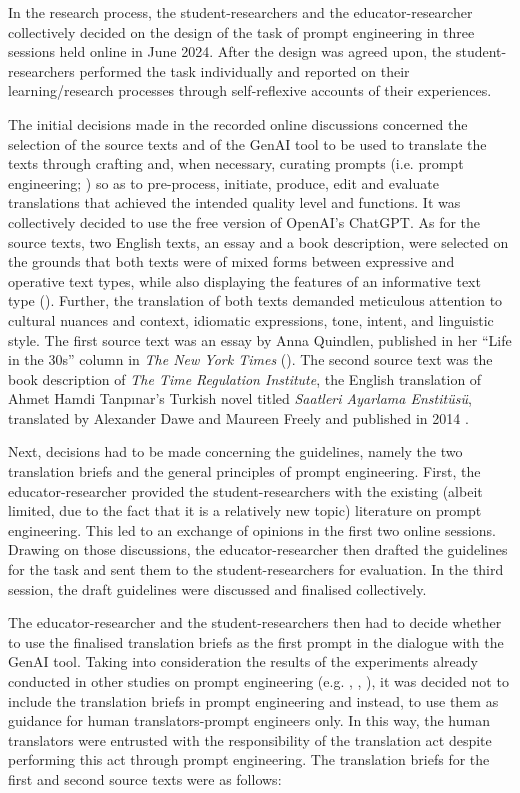 \documentclass[output=paper,colorlinks,citecolor=brown]{langscibook}
\begin{document}
In the research process, the student-researchers and the educator-researcher collectively decided on the design of the task of prompt engineering in three sessions held online in June 2024. After the design was agreed upon, the student-researchers performed the task individually and reported on their learning/research processes through self-reflexive accounts of their experiences.

The initial decisions made in the recorded online discussions concerned the selection of the source texts and of the GenAI tool to be used to translate the texts through crafting and, when necessary, curating prompts (i.e. prompt engineering; \cite{yamada-2023-optimizing}) so as to pre-process, initiate, produce, edit and evaluate translations that achieved the intended quality level and functions. It was collectively decided to use the free version of OpenAI’s ChatGPT. As for the source texts, two English texts, an essay and a book description, were selected on the grounds that both texts were of mixed forms between expressive and operative text types, while also displaying the features of an informative text type (\cite[124--125]{reiss1981}). Further, the translation of both texts demanded meticulous attention to cultural nuances and context, idiomatic expressions, tone, intent, and linguistic style. The first source text was an essay by Anna Quindlen, published in her “Life in the 30s” column in \textit{The New York Times} (\cite{quindlen1987}). The second source text was the book description of \textit{The Time Regulation Institute}, the English translation of Ahmet Hamdi Tanpınar’s Turkish novel titled \textit{Saatleri Ayarlama Enstitüsü}, translated by Alexander Dawe and Maureen Freely and published in 2014 \citep{Tanpinar2014}.

Next, decisions had to be made concerning the guidelines, namely the two translation briefs and the general principles of prompt engineering. First, the educator-researcher provided the student-researchers with the existing (albeit limited, due to the fact that it is a relatively new topic) literature on prompt engineering. This led to an exchange of opinions in the first two online sessions. Drawing on those discussions, the educator-researcher then drafted the guidelines for the task and sent them to the student-researchers for evaluation. In the third session, the draft guidelines were discussed and finalised collectively.

The educator-researcher and the student-researchers then had to decide whether to use the finalised translation briefs as the first prompt in the dialogue with the GenAI tool. Taking into consideration the results of the experiments already conducted in other studies on prompt engineering (e.g. \cite{he2024promptingchatgpttranslationcomparative}, \cite{peng2023makingchatgptmachinetranslation}, \cite{yamada-2023-optimizing}), it was decided not to include the translation briefs in prompt engineering and instead, to use them as guidance for human translators-prompt engineers only. In this way, the human translators were entrusted with the responsibility of the translation act despite performing this act through prompt engineering. The translation briefs for the first and second source texts were as follows:
\end{document}
